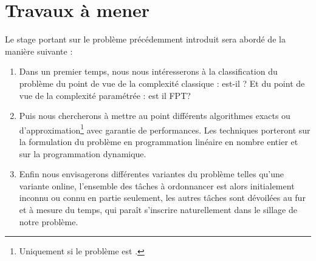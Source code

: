 \documentclass[a4paper,11pt]{report}
\begin{document}
\newpage

\chapter{Travaux à mener}

Le stage portant sur le problème précédemment introduit sera abordé de la manière suivante :
\begin{enumerate}
    \item Dans un premier temps, nous nous intéresserons à la classification du problème du point de
        vue de la complexité classique : \fisched{} est-il \npc? Et du point de vue de la complexité
        paramétrée : est il FPT?
    \item Puis nous chercherons à mettre au point différents algorithmes exacts ou
        d'approximation\footnote{Uniquement si le problème est \npc.} avec garantie de performances.
        Les techniques porteront sur la formulation du problème en programmation linéaire en nombre
        entier et sur la programmation dynamique.
    \item Enfin nous envisagerons différentes variantes du problème telles qu'une variante online,
        l'ensemble des tâches à ordonnancer est alors initialement inconnu ou connu en partie
        seulement, les autres tâches sont dévoilées au fur et à mesure du temps, qui paraît
        s'inscrire naturellement dans le sillage de notre problème.
\end{enumerate}

\newpage
\appendix


\end{document}
